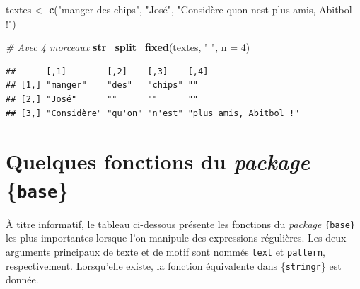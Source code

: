 \documentclass[
  11pt,
]{book}
\newenvironment{Shaded}{\begin{snugshade}}{\end{snugshade}}
\newcommand{\CommentTok}[1]{\textcolor[rgb]{0.56,0.35,0.01}{\textit{#1}}}
\newcommand{\DataTypeTok}[1]{\textcolor[rgb]{0.13,0.29,0.53}{#1}}
\newcommand{\DecValTok}[1]{\textcolor[rgb]{0.00,0.00,0.81}{#1}}
\newcommand{\KeywordTok}[1]{\textcolor[rgb]{0.13,0.29,0.53}{\textbf{#1}}}
\newcommand{\NormalTok}[1]{#1}
\newcommand{\StringTok}[1]{\textcolor[rgb]{0.31,0.60,0.02}{#1}}
\numberwithin{equation}{section}
\numberwithin{countremarque}{section}
\begin{document}
\begin{Shaded}
\begin{Highlighting}[]
\NormalTok{textes \textless{}{-}}\StringTok{ }\KeywordTok{c}\NormalTok{(}\StringTok{"manger des chips"}\NormalTok{, }\StringTok{"José"}\NormalTok{,}
            \StringTok{"Considère qu\textquotesingle{}on n\textquotesingle{}est plus amis, Abitbol !"}\NormalTok{)}

\CommentTok{\# Avec 4 morceaux}
\KeywordTok{str\_split\_fixed}\NormalTok{(textes, }\StringTok{" "}\NormalTok{, }\DataTypeTok{n =} \DecValTok{4}\NormalTok{)}
\end{Highlighting}
\end{Shaded}

\begin{lstlisting}
##      [,1]        [,2]    [,3]    [,4]                  
## [1,] "manger"    "des"   "chips" ""                    
## [2,] "José"      ""      ""      ""                    
## [3,] "Considère" "qu'on" "n'est" "plus amis, Abitbol !"
\end{lstlisting}

\hypertarget{manip_regex_base}{%
\section{\texorpdfstring{Quelques fonctions du \emph{package} \{\texttt{base}\}}{Quelques fonctions du package \{base\}}}\label{manip_regex_base}}

À titre informatif, le tableau ci-dessous présente les fonctions du \emph{package} \texttt{\{base\}} les plus importantes lorsque l'on manipule des expressions régulières. Les deux arguments principaux de texte et de motif sont nommés \texttt{text} et \texttt{pattern}, respectivement. Lorsqu'elle existe, la fonction équivalente dans \{\texttt{stringr}\} est donnée.
\end{document}
